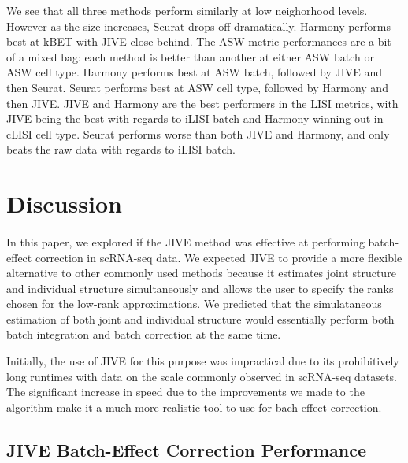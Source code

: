 \documentclass[
12pt, %
letterpaper, %
oneside, %
headinclude,footinclude, %
BCOR5mm, %
]{scrartcl}
\begin{document}
We see that all three methods perform similarly at low neighorhood levels. However as the size increases, Seurat drops off dramatically. Harmony performs best at kBET with JIVE close behind. The ASW metric performances are a bit of a mixed bag: each method is better than another at either ASW batch or ASW cell type. Harmony performs best at ASW batch, followed by JIVE and then Seurat. Seurat performs best at ASW cell type, followed by Harmony and then JIVE. JIVE and Harmony are the best performers in the LISI metrics, with JIVE being the best with regards to iLISI batch and Harmony winning out in cLISI cell type. Seurat performs worse than both JIVE and Harmony, and only beats the raw data with regards to iLISI batch.


\section{Discussion}

\paragraph*{}
In this paper, we explored if the JIVE method was effective at performing batch-effect correction in scRNA-seq data. We expected JIVE to provide a more flexible alternative to other commonly used methods because it estimates joint structure and individual structure simultaneously and allows the user to specify the ranks chosen for the low-rank approximations. We predicted that the simulataneous estimation of both joint and individual structure would essentially perform both batch integration and batch correction at the same time. 

Initially, the use of JIVE for this purpose was impractical due to its prohibitively long runtimes with data on the scale commonly observed in scRNA-seq datasets. The significant increase in speed due to the improvements we made to the algorithm make it a much more realistic tool to use for bach-effect correction.


\subsection{JIVE Batch-Effect Correction Performance}
\end{document}
